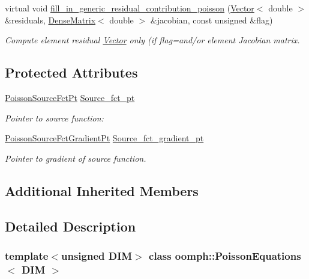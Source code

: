 \begin{DoxyCompactItemize}
virtual void \hyperlink{classoomph_1_1PoissonEquations_a02c40bfa9b59fa7935677999623da633}{fill\+\_\+in\+\_\+generic\+\_\+residual\+\_\+contribution\+\_\+poisson} (\hyperlink{classoomph_1_1Vector}{Vector}$<$ double $>$ \&residuals, \hyperlink{classoomph_1_1DenseMatrix}{Dense\+Matrix}$<$ double $>$ \&jacobian, const unsigned \&flag)
\begin{DoxyCompactList}\small\item\em Compute element residual \hyperlink{classoomph_1_1Vector}{Vector} only (if flag=and/or element Jacobian matrix. \end{DoxyCompactList}\end{DoxyCompactItemize}
\subsection*{Protected Attributes}
\begin{DoxyCompactItemize}
\item 
\hyperlink{classoomph_1_1PoissonEquations_a1e3a857c1f506c99d437fb932a24c828}{Poisson\+Source\+Fct\+Pt} \hyperlink{classoomph_1_1PoissonEquations_a4e177939f01ea418aa8a965811877b13}{Source\+\_\+fct\+\_\+pt}
\begin{DoxyCompactList}\small\item\em Pointer to source function\+: \end{DoxyCompactList}\item 
\hyperlink{classoomph_1_1PoissonEquations_a6182c46eb07d6219d6f939f0962724c4}{Poisson\+Source\+Fct\+Gradient\+Pt} \hyperlink{classoomph_1_1PoissonEquations_a53bef5cd00f9f0e0c352bc1383c29ec7}{Source\+\_\+fct\+\_\+gradient\+\_\+pt}
\begin{DoxyCompactList}\small\item\em Pointer to gradient of source function. \end{DoxyCompactList}\end{DoxyCompactItemize}
\subsection*{Additional Inherited Members}


\subsection{Detailed Description}
\subsubsection*{template$<$unsigned D\+IM$>$\newline
class oomph\+::\+Poisson\+Equations$<$ D\+I\+M $>$}

